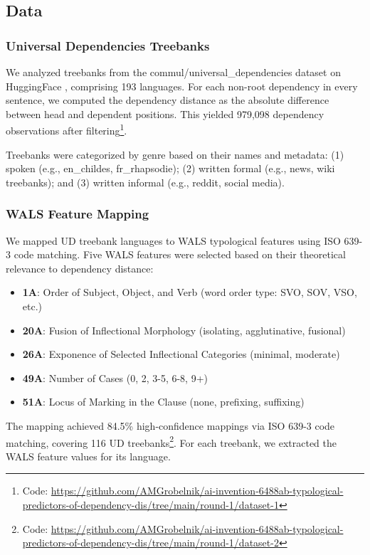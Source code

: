 \documentclass[11pt,letterpaper]{article}
\begin{document}
\subsection{Data}

\subsubsection{Universal Dependencies Treebanks}

We analyzed treebanks from the commul/universal\_dependencies dataset on HuggingFace \cite{Nivre2020}, comprising 193 languages. For each non-root dependency in every sentence, we computed the dependency distance as the absolute difference between head and dependent positions. This yielded 979,098 dependency observations after filtering\footnote{Code: \url{https://github.com/AMGrobelnik/ai-invention-6488ab-typological-predictors-of-dependency-dis/tree/main/round-1/dataset-1}}.

Treebanks were categorized by genre based on their names and metadata: (1) spoken (e.g., en\_childes, fr\_rhapsodie); (2) written formal (e.g., news, wiki treebanks); and (3) written informal (e.g., reddit, social media).

\subsubsection{WALS Feature Mapping}

We mapped UD treebank languages to WALS typological features \cite{Dryer2013} using ISO 639-3 code matching. Five WALS features were selected based on their theoretical relevance to dependency distance:

\begin{itemize}
  \item \textbf{1A}: Order of Subject, Object, and Verb (word order type: SVO, SOV, VSO, etc.)
  \item \textbf{20A}: Fusion of Inflectional Morphology (isolating, agglutinative, fusional)
  \item \textbf{26A}: Exponence of Selected Inflectional Categories (minimal, moderate)
  \item \textbf{49A}: Number of Cases (0, 2, 3-5, 6-8, 9+)
  \item \textbf{51A}: Locus of Marking in the Clause (none, prefixing, suffixing)
\end{itemize}

The mapping achieved 84.5\% high-confidence mappings via ISO 639-3 code matching, covering 116 UD treebanks\footnote{Code: \url{https://github.com/AMGrobelnik/ai-invention-6488ab-typological-predictors-of-dependency-dis/tree/main/round-1/dataset-2}}. For each treebank, we extracted the WALS feature values for its language.
\end{document}
